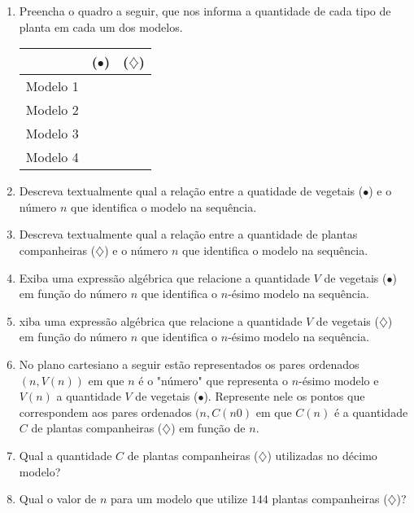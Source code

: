 \documentclass[10 pt,usenames,dvipsnames, oneside]{article}
\begin{document}
\begin{enumerate}
\item Preencha o quadro a seguir, que nos informa a quantidade de cada tipo de planta em cada um dos modelos.

\begin{table}[H]
\centering
\setlength\tabulinesep{2.5pt}
\begin{tabu} to 
\hline
& ({\Large$\bullet$}) & ({\Large$\diamondsuit$}) \\
\hline
Modelo 1 & & \\
\hline
Modelo 2 & & \\
\hline
Modelo 3 & & \\
\hline
Modelo 4 & & \\
\hline
\end{tabu}
\end{table}
\item Descreva textualmente qual a relação entre a quatidade de vegetais ({\Large$\bullet$}) e o número $n$ que identifica o modelo na sequência.

\item Descreva textualmente qual a relação entre a quantidade de plantas companheiras ({\Large$\diamondsuit$}) e o número $n$ que identifica o modelo na sequência.
\item Exiba uma expressão algébrica que relacione a quantidade $V$ de vegetais ({\Large$\bullet$}) em função do número $n$ que identifica o $n$-ésimo modelo na sequência.
\item xiba uma expressão algébrica que relacione a quantidade $V$ de vegetais ({\Large$\diamondsuit$}) em função do número $n$ que identifica o $n$-ésimo modelo na sequência.
\item No plano cartesiano a seguir estão representados os pares ordenados $(n,V(n))$ em que $n$ é o "número"{} que representa o $n$-ésimo modelo e $V(n)$ a quantidade $V$ de vegetais ({\Large$\bullet$}). Represente nele os pontos que correspondem aos pares ordenados $(n,C(n0)$ em que $C(n)$ é a quantidade $C$ de plantas companheiras ({\Large$\diamondsuit$}) em função de $n$.

\begin{figure}[H]
\centering
{}

\end{figure}
\item Qual a quantidade $C$ de plantas companheiras ({\Large$\diamondsuit$}) utilizadas no décimo modelo?
\item Qual o valor de $n$ para um modelo que utilize $144$ plantas companheiras ({\Large$\diamondsuit$})?
\end{enumerate}
\end{document}

